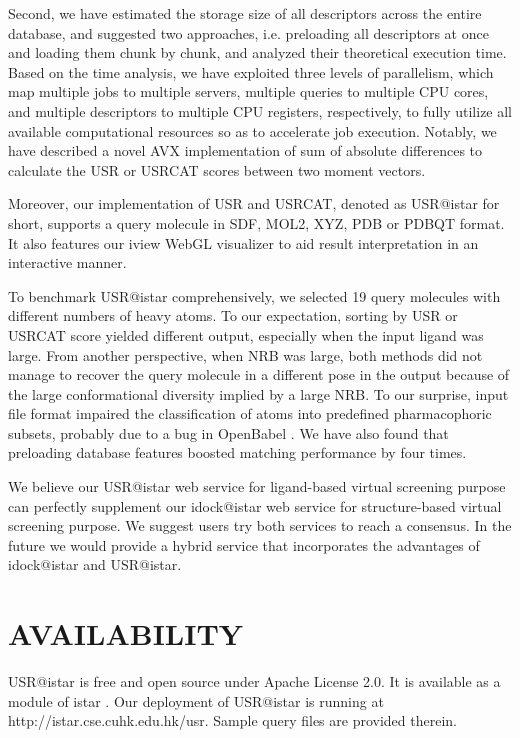 \documentclass[a4,center,fleqn]{NAR}
\begin{document}
Second, we have estimated the storage size of all descriptors across the entire database, and suggested two approaches, i.e. preloading all descriptors at once and loading them chunk by chunk, and analyzed their theoretical execution time. Based on the time analysis, we have exploited three levels of parallelism, which map multiple jobs to multiple servers, multiple queries to multiple CPU cores, and multiple descriptors to multiple CPU registers, respectively, to fully utilize all available computational resources so as to accelerate job execution. Notably, we have described a novel AVX implementation of sum of absolute differences to calculate the USR or USRCAT scores between two moment vectors.

Moreover, our implementation of USR and USRCAT, denoted as USR@istar for short, supports a query molecule in SDF, MOL2, XYZ, PDB or PDBQT format. It also features our iview \cite{1366} WebGL visualizer to aid result interpretation in an interactive manner.

To benchmark USR@istar comprehensively, we selected 19 query molecules with different numbers of heavy atoms. To our expectation, sorting by USR or USRCAT score yielded different output, especially when the input ligand was large. From another perspective, when NRB was large, both methods did not manage to recover the query molecule in a different pose in the output because of the large conformational diversity implied by a large NRB. To our surprise, input file format impaired the classification of atoms into predefined pharmacophoric subsets, probably due to a bug in OpenBabel \cite{968}. We have also found that preloading database features boosted matching performance by four times.

We believe our USR@istar web service for ligand-based virtual screening purpose can perfectly supplement our idock@istar web service for structure-based virtual screening purpose. We suggest users try both services to reach a consensus. In the future we would provide a hybrid service that incorporates the advantages of idock@istar and USR@istar.

\section{AVAILABILITY}

USR@istar is free and open source under Apache License 2.0. It is available as a module of istar \cite{1362}. Our deployment of USR@istar is running at http://istar.cse.cuhk.edu.hk/usr. Sample query files are provided therein.
\end{document}
